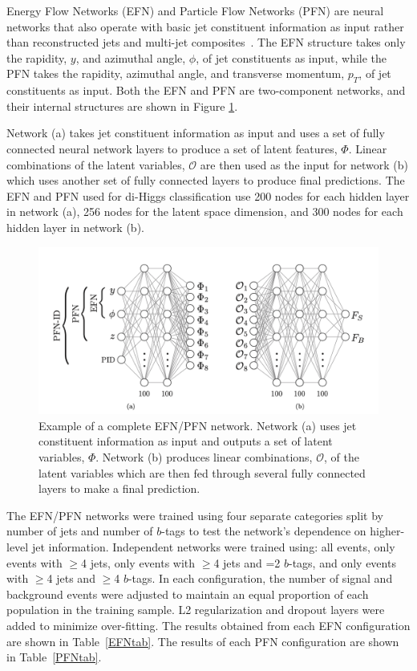 \label{sec:EFN}
Energy Flow Networks (EFN) and Particle Flow Networks (PFN) are neural networks that also operate with basic jet constituent information as input rather than reconstructed jets and multi-jet composites~\cite{Komiske:2018cqr}. The EFN structure takes only the rapidity, ${y}$, and azimuthal angle, ${\phi}$, of jet constituents as input, while the PFN takes the rapidity, azimuthal angle, and transverse momentum, $p_{T}$, of jet constituents as input. Both the EFN and PFN are two-component networks, and their internal structures are shown in Figure \ref{fig:EFNArch}.

Network (a) takes jet constituent information as input and uses a set of fully connected neural network layers to produce a set of latent features, \textbf{$\Phi$}. Linear combinations of the latent variables, \textbf{$\mathcal{O}$} are then used as the input for network (b) which uses another set of fully connected layers to produce final predictions. The EFN and PFN used for di-Higgs classification use 200 nodes for each hidden layer in network (a), 256 nodes for the latent space dimension, and 300 nodes for each hidden layer in network (b). 

\begin{figure}[ht!]
\centering
\includegraphics[scale=0.5]{./EFN/EFNArch.png}
\caption{Example of a complete EFN/PFN network. Network (a) uses jet constituent information as input and outputs a set of latent variables, $\Phi$. Network (b) produces linear combinations, $\mathcal{O}$, of the latent variables which are then fed through several fully connected layers to make a final prediction.}
\label{fig:EFNArch}
\end{figure}

The EFN/PFN networks were trained using four separate categories split by number of jets and number of $b$-tags to test the network's dependence on higher-level jet information. Independent networks were trained using: all events, only events with $\geq$4 jets, only events with $\geq$4 jets and =2 $b$-tags, and only events with $\geq$4 jets and $\geq$4 $b$-tags. In each configuration, the number of signal and background events were adjusted to maintain an equal proportion of each population in the training sample. L2 regularization and dropout layers were added to minimize over-fitting. The results obtained from each EFN configuration are shown in Table~\ref{EFNtab}. The results of each PFN configuration are shown in Table~\ref{PFNtab}.

